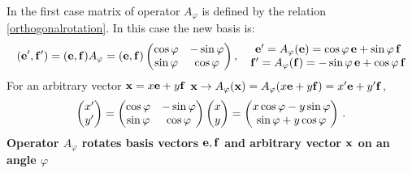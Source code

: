 \documentclass[12pt]{article}
\numberwithin{equation}{section}
\begin{document}
 In the first case matrix of operator $A_\varphi$ is 
defined by the relation \eqref{orthogonalrotation}.
In this case the new basis is:
    \begin{equation}\label{rotationofbasisontheangle}
   ({\bf e}',{\bf f}')=
   ({\bf e},{\bf f})
     A_\varphi=
     ({\bf e},{\bf f})
   \begin{pmatrix}
      \cos\varphi & -\sin\varphi \\
      \sin\varphi & \cos\varphi \\
    \end{pmatrix}
                 ,\quad
            \begin{matrix}
   {\bf e}'=A_\varphi({\bf e})= \cos\varphi \,{\bf e}+\sin\varphi \,{\bf f}\cr
   {\bf f}'=A_\varphi({\bf f})=-\sin\varphi\, {\bf e}+\cos\varphi \,{\bf f}\cr
            \end{matrix}
            \end{equation}
For an arbitrary vector ${\bf x}=x{\bf e}+y{\bf f}$
${\bf x}\to A_\varphi({\bf x})=A_\varphi(x{\bf e}+y{\bf f})=x'{\bf e}+y'{\bf f}$,
             \begin{equation}
        \begin{pmatrix}
           x'\cr y'\cr
        \end{pmatrix} =
          \begin{pmatrix}
      \cos\varphi & -\sin\varphi \\
      \sin\varphi & \cos\varphi \\
             \end{pmatrix}
           \begin{pmatrix}
           x\cr y\cr
        \end{pmatrix}=
           \begin{pmatrix}
           x\cos\varphi-y\sin\varphi\cr 
        \sin\varphi+y\cos\varphi\cr
        \end{pmatrix}\,.
             \end{equation}
{\bf  Operator $A_\varphi$ rotates 
basis vectors ${\bf e},{\bf f}$ and arbitrary vector ${\bf x}$ on an angle
$\varphi$ }


\m
\end{document}

